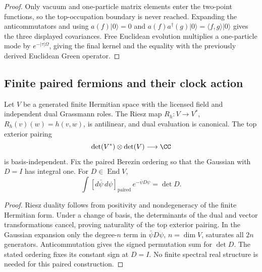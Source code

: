 \documentclass[12pt,a4paper]{article}
\begin{document}
\begin{proof}
Only vacuum and one-particle matrix elements enter the two-point functions, so
the top-occupation boundary is never reached.  Expanding the anticommutators
and using \(a(f)|0\rangle=0\) and
\(a(f)a^\dagger(g)|0\rangle=\langle f,g\rangle|0\rangle\) gives the three
displayed covariances.  Free Euclidean evolution multiplies a one-particle
mode by \(e^{-|\tau|\Omega}\), giving the final kernel and the equality with
the previously derived Euclidean Green operator.
\end{proof}



\subsection{Finite paired fermions and their clock action}

\begin{proposition}
\label{p4:prop:paired-berezin-determinant-line}
Let \(V\) be a generated finite Hermitian space with the licensed
field and independent dual Grassmann roles.  The Riesz map
\(R_h:V\to V^*\), \(R_h(v)(w)=h(v,w)\), is antilinear, and
dual evaluation is canonical.  The top exterior pairing
\[
 \det(V^*)\otimes\det(V)\longrightarrow\CC
\]
is basis-independent.  Fix the paired Berezin ordering so that
the Gaussian with \(D=I\) has integral one.  For
\(D\in\operatorname{End}V\),
\[
 \int[d\bar\psi\,d\psi]_{\mathrm{paired}}\,
       e^{-\bar\psi D\psi}=\det D.
\]
\end{proposition}
\begin{proof}
Riesz duality follows from positivity and nondegeneracy of the
finite Hermitian form.  Under a change of basis, the determinants
of the dual and vector transformations cancel, proving naturality
of the top exterior pairing.  In the Gaussian expansion only the
degree-\(n\) term in \(\bar\psi D\psi\), \(n=\dim V\), saturates
all \(2n\) generators.  Anticommutation gives the signed
permutation sum for \(\det D\).  The stated ordering fixes its
constant sign at \(D=I\).  No finite spectral real structure is
needed for this paired construction.
\end{proof}
\end{document}
